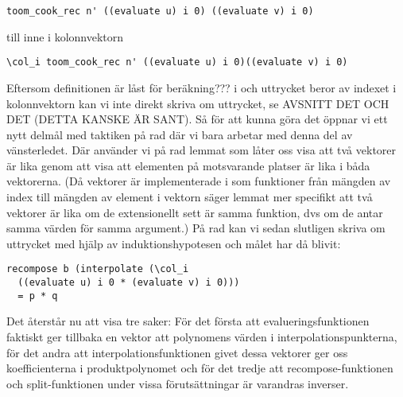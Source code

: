 \begin{lstlisting}
toom_cook_rec n' ((evaluate u) i 0) ((evaluate v) i 0)
\end{lstlisting}
till  inne i kolonnvektorn
\begin{lstlisting}
\col_i toom_cook_rec n' ((evaluate u) i 0)((evaluate v) i 0)
\end{lstlisting}
Eftersom definitionen  är låst för beräkning??? i \ssr och uttrycket
beror av indexet  i kolonnvektorn kan vi inte direkt skriva om uttrycket,
se AVSNITT DET OCH DET (DETTA KANSKE ÄR SANT). Så för att kunna göra det öppnar
vi ett nytt delmål med taktiken  på rad  där vi bara arbetar med
denna del av vänsterledet. Där använder vi på rad  lemmat  som
låter oss visa att två vektorer är lika genom att visa att elementen på
motsvarande platser är lika i båda vektorerna. (Då vektorer är implementerade i
\ssr som funktioner från mängden av index till mängden av element i vektorn
säger lemmat mer specifikt att två vektorer är lika om de extensionellt sett är
samma funktion, dvs om de antar samma värden för samma argument.) På rad 
kan vi sedan slutligen skriva om uttrycket med hjälp av induktionshypotesen och
målet har då blivit:
\begin{lstlisting}
recompose b (interpolate (\col_i
  ((evaluate u) i 0 * (evaluate v) i 0)))
  = p * q
\end{lstlisting}
Det återstår nu att visa tre saker: För det första att evalueringsfunktionen
faktiskt ger tillbaka en vektor att polynomens värden i
interpolationspunkterna, för det andra att interpolationsfunktionen givet dessa
vektorer ger oss koefficienterna i produktpolynomet och för det tredje att
recompose-funktionen och split-funktionen under vissa förutsättningar är
varandras inverser.


